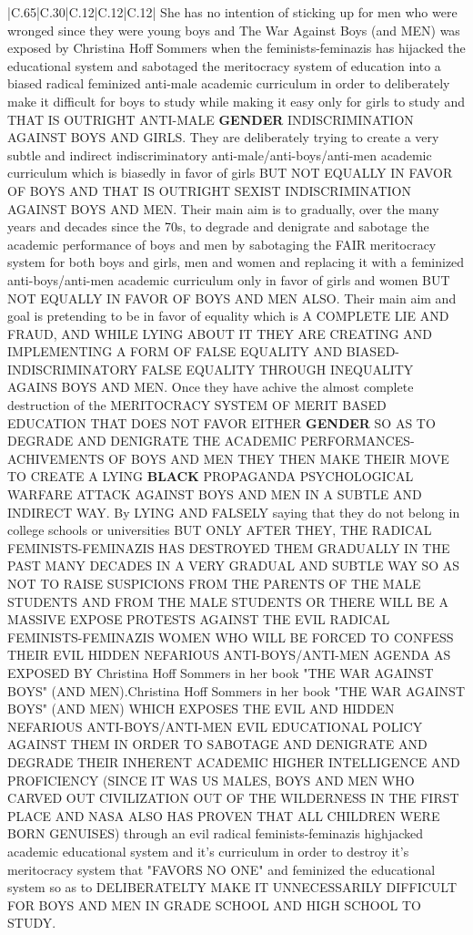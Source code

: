 \documentclass[11pt]{article}
\newlength\mylength
\begin{document}
\begin{center}
\begin{longtable}{|C{.65\mylength}|C{.30\mylength}|C{.12\mylength}|C{.12\mylength}|C{.12\mylength}|}
  \small She has no intention of sticking up for men who were wronged since they were young boys and The War Against Boys (and MEN) was exposed by Christina Hoff Sommers when the feminists-feminazis has hijacked the educational system and sabotaged the meritocracy system of education into a biased radical feminized anti-male academic curriculum in order to deliberately make it difficult for boys to study while making it easy only for girls to study and THAT IS OUTRIGHT ANTI-MALE \textbf{GENDER} INDISCRIMINATION AGAINST BOYS AND GIRLS. They are deliberately trying to create a very subtle and indirect indiscriminatory anti-male/anti-boys/anti-men academic curriculum which is biasedly in favor of girls BUT NOT EQUALLY IN FAVOR OF BOYS AND THAT IS OUTRIGHT SEXIST INDISCRIMINATION AGAINST BOYS AND MEN. Their main aim is to gradually, over the many years and decades since the 70s, to degrade and denigrate and sabotage the academic performance of boys and men by sabotaging the FAIR meritocracy system for both boys and girls, men and women and replacing it with a feminized anti-boys/anti-men academic curriculum only in favor of girls and women BUT NOT EQUALLY IN FAVOR OF BOYS AND MEN ALSO. Their main aim and goal is pretending to be in favor of equality which is A COMPLETE LIE AND FRAUD, AND WHILE LYING ABOUT IT THEY ARE CREATING AND IMPLEMENTING A FORM OF FALSE EQUALITY AND BIASED-INDISCRIMINATORY FALSE EQUALITY THROUGH INEQUALITY AGAINS BOYS AND MEN. Once they have achive the almost complete destruction of the MERITOCRACY SYSTEM OF MERIT BASED EDUCATION THAT DOES NOT FAVOR EITHER \textbf{GENDER} SO AS TO DEGRADE AND DENIGRATE THE ACADEMIC PERFORMANCES-ACHIVEMENTS OF BOYS AND MEN THEY THEN MAKE THEIR MOVE TO CREATE A LYING \textbf{BLACK} PROPAGANDA PSYCHOLOGICAL WARFARE ATTACK AGAINST BOYS AND MEN IN A SUBTLE AND INDIRECT WAY. By LYING AND FALSELY saying that they do not belong in college schools or universities BUT ONLY AFTER THEY, THE RADICAL FEMINISTS-FEMINAZIS HAS DESTROYED THEM GRADUALLY IN THE PAST MANY DECADES IN A VERY GRADUAL AND SUBTLE WAY SO AS NOT TO RAISE SUSPICIONS FROM THE PARENTS OF THE MALE STUDENTS AND FROM THE MALE STUDENTS OR THERE WILL BE A MASSIVE EXPOSE PROTESTS AGAINST THE EVIL RADICAL FEMINISTS-FEMINAZIS WOMEN WHO WILL BE FORCED TO CONFESS THEIR EVIL HIDDEN NEFARIOUS ANTI-BOYS/ANTI-MEN AGENDA AS EXPOSED BY  Christina Hoff Sommers in her book "THE WAR AGAINST BOYS" (AND MEN).Christina Hoff Sommers in her book "THE WAR AGAINST BOYS" (AND MEN) WHICH EXPOSES THE EVIL AND HIDDEN NEFARIOUS ANTI-BOYS/ANTI-MEN EVIL EDUCATIONAL POLICY AGAINST THEM IN ORDER TO SABOTAGE AND DENIGRATE AND DEGRADE THEIR INHERENT ACADEMIC HIGHER INTELLIGENCE AND PROFICIENCY (SINCE IT WAS US MALES, BOYS AND MEN WHO CARVED OUT CIVILIZATION OUT OF THE WILDERNESS IN THE FIRST PLACE AND NASA ALSO HAS PROVEN THAT ALL CHILDREN WERE BORN GENUISES) through an evil radical feminists-feminazis highjacked academic educational system and it's curriculum in order to destroy it's meritocracy system that "FAVORS NO ONE" and feminized the educational system so as to DELIBERATELTY MAKE IT UNNECESSARILY DIFFICULT FOR BOYS AND MEN IN GRADE SCHOOL AND HIGH SCHOOL TO STUDY. 
\end{longtable}
\end{center}
\end{document}
